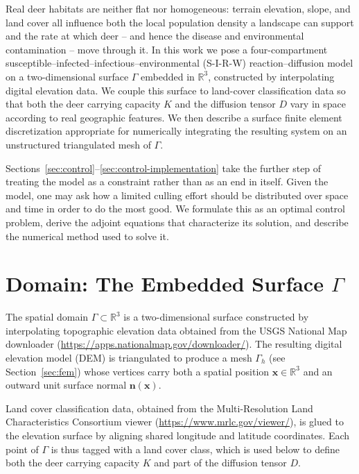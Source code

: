 \documentclass[11pt]{article}
\begin{document}
Real deer habitats are neither flat nor homogeneous: terrain elevation, slope, and land cover all influence both the local population density a landscape can support and the rate at which deer -- and hence the disease and environmental contamination -- move through it. In this work we pose a four-compartment susceptible--infected--infectious--environmental (S-I-R-W) reaction--diffusion model on a two-dimensional surface $\Gamma$ embedded in $\mathbb{R}^3$, constructed by interpolating digital elevation data. We couple this surface to land-cover classification data so that both the deer carrying capacity $K$ and the diffusion tensor $D$ vary in space according to real geographic features. We then describe a surface finite element discretization appropriate for numerically integrating the resulting system on an unstructured triangulated mesh of $\Gamma$.

Sections~\ref{sec:control}--\ref{sec:control-implementation} take the further step of treating the model as a constraint rather than as an end in itself. Given the model, one may ask how a limited culling effort should be distributed over space and time in order to do the most good. We formulate this as an optimal control problem, derive the adjoint equations that characterize its solution, and describe the numerical method used to solve it.

\section{Domain: The Embedded Surface $\Gamma$}
\label{sec:domain}

The spatial domain $\Gamma \subset \mathbb{R}^3$ is a two-dimensional surface constructed by interpolating topographic elevation data obtained from the USGS National Map downloader (\url{https://apps.nationalmap.gov/downloader/}). The resulting digital elevation model (DEM) is triangulated to produce a mesh $\Gamma_h$ (see Section~\ref{sec:fem}) whose vertices carry both a spatial position $\mathbf{x} \in \mathbb{R}^3$ and an outward unit surface normal $\mathbf{n}(\mathbf{x})$.

Land cover classification data, obtained from the Multi-Resolution Land Characteristics Consortium viewer (\url{https://www.mrlc.gov/viewer/}), is glued to the elevation surface by aligning shared longitude and latitude coordinates. Each point of $\Gamma$ is thus tagged with a land cover class, which is used below to define both the deer carrying capacity $K$ and part of the diffusion tensor $D$.
\end{document}
